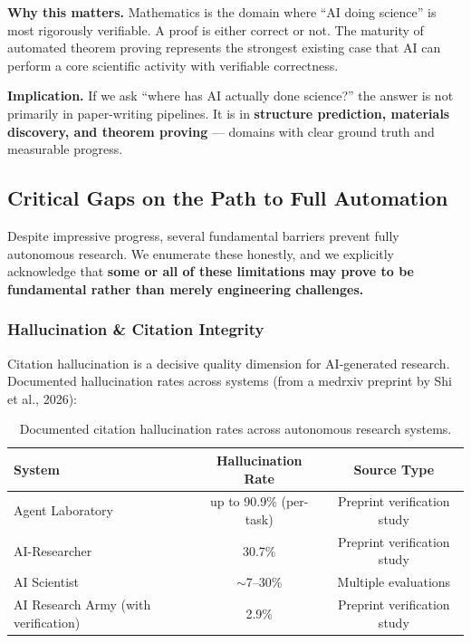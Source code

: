 \documentclass[11pt,a4paper]{article}
\begin{document}
\textbf{Why this matters.} Mathematics is the domain where ``AI doing science'' is most rigorously verifiable. A proof is either correct or not. The maturity of automated theorem proving represents the strongest existing case that AI can perform a core scientific activity with verifiable correctness.

\textbf{Implication.} If we ask ``where has AI actually done science?'' the answer is not primarily in paper-writing pipelines. It is in \textbf{structure prediction, materials discovery, and theorem proving} --- domains with clear ground truth and measurable progress.

\subsection{Critical Gaps on the Path to Full Automation}

Despite impressive progress, several fundamental barriers prevent fully autonomous research. We enumerate these honestly, and we explicitly acknowledge that \textbf{some or all of these limitations may prove to be fundamental rather than merely engineering challenges.}

\subsubsection{Hallucination \& Citation Integrity}

Citation hallucination is a decisive quality dimension for AI-generated research. Documented hallucination rates across systems (from a medrxiv preprint by Shi et al., 2026):

\begin{table}[h]
\centering
\small
\begin{tabular}{@{}lcc@{}}
\toprule
\textbf{System} & \textbf{Hallucination Rate} & \textbf{Source Type} \\
\midrule
Agent Laboratory & up to 90.9\% (per-task) & Preprint verification study \\
AI-Researcher & 30.7\% & Preprint verification study \\
AI Scientist & $\sim$7--30\% & Multiple evaluations \\
AI Research Army (with verification) & 2.9\% & Preprint verification study \\
\bottomrule
\end{tabular}
\caption{Documented citation hallucination rates across autonomous research systems.}
\label{tab:hallucination}
\end{table}
\end{document}
